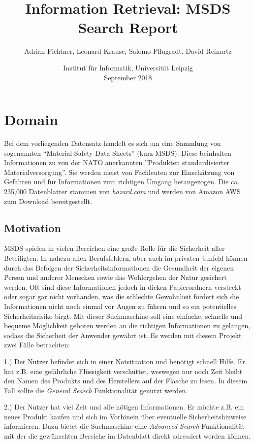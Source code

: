 \documentclass[oneside, a4paper, 12pt, titlepage]{article}
\title{Information Retrieval: MSDS Search Report}
\date{ \small{Institut für Informatik, Universität Leipzig} \\[2ex] September 2018}
\author{Adrian Fichtner, Leonard Krause, Salomo Pflugradt, David Reinartz}
\begin{document}
\flushbottom
\maketitle
\tableofcontents
\newpage

\section{Domain}
Bei dem vorliegenden Datensatz handelt es sich um eine Sammlung von sogenannten ``Material Safety Data Sheets'' (kurz MSDS).
Diese beinhalten Informationen zu von der NATO anerkannten ''Produkten standardisierter Materialversorgung''.
Sie werden meist von Fachleuten zur Einschätzung von Gefahren und für Informationen zum richtigen Umgang herangezogen.
Die ca. 235,000 Datenblätter stammen von \textit{hazard.com} und werden von Amazon AWS zum Download bereitgestellt.
\subsection{Motivation}
MSDS spielen in vielen Bereichen eine große Rolle für die Sicherheit aller Beteiligten. In nahezu allen Berufsfeldern, aber auch im privaten Umfeld können durch das Befolgen der Sicherheitsinformationen die Gesundheit der eigenen Person und anderer Menschen sowie das Wohlergehen der Natur gesichert werden. Oft sind diese Informationen jedoch in dicken Papierordnern versteckt oder sogar gar nicht vorhanden, was die schlechte Gewohnheit fördert sich die Informationen nicht noch einmal vor Augen zu führen und so ein potentielles Sicherheitsrisiko birgt. Mit dieser Suchmaschine soll eine einfache, schnelle und bequeme Möglichkeit geboten werden an die richtigen Informationen zu gelangen, sodass die Sicherheit der Anwender gewährt ist. Es werden mit diesem Projekt zwei Fälle betrachten:

1.) Der Nutzer befindet sich in einer Notsituation und benötigt schnell Hilfe. Er hat z.B. eine gefährliche Flüssigkeit verschüttet, weswegen nur noch Zeit bleibt den Namen des Produkts und des Herstellers auf der Flasche zu lesen. In diesem Fall sollte die \textit{General Search} Funktionalität genutzt werden.

2.) Der Nutzer hat viel Zeit und alle nötigen Informationen.
Er möchte z.B. ein neues Produkt kaufen und sich im Vorhinein über eventuelle Sicherheitshinweise informieren. Dazu bietet die Suchmaschine eine \textit{Advanced Search} Funktionalität mit der die gewünschten Bereiche im Datenblatt direkt adressiert werden können.
\end{document}
